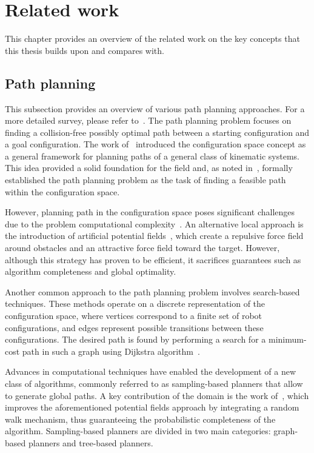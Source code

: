 \chapter{Related work}\label{chap:related_work}

This chapter provides an overview of the related work on the key concepts that this thesis builds upon and compares with.

\section{Path planning}

This subsection provides an overview of various path planning approaches. 
For a more detailed survey, please refer to~\cite{cLavalle, cFrazzoli, cKavraki}.
The path planning problem focuses on finding a collision-free possibly optimal path between a starting configuration and a goal configuration. 
The work of~\cite{cConfigSpace} introduced the configuration space concept as a general framework for planning paths of a general class of kinematic systems.
This idea provided a solid foundation for the field and, as noted in~\cite{cSpatialPlan}, formally established the path planning problem as the task of finding a feasible path within the configuration space.

However, planning path in the configuration space poses significant challenges due to the problem computational complexity~\cite{cComplexity}. 
An alternative local approach is the introduction of artificial potential fields~\cite{cAPF}, which create a repulsive force field around obstacles and an attractive force field toward the target.
However, although this strategy has proven to be efficient, it sacrifices guarantees such as algorithm completeness and global optimality.

Another common approach to the path planning problem involves search-based techniques. 
These methods operate on a discrete representation of the configuration space, where vertices correspond to a finite set of robot configurations, and edges represent possible transitions between these configurations.
The desired path is found by performing a search for a minimum-cost path in such a graph using Dijkstra algorithm~\cite{cDijk}. 

Advances in computational techniques have enabled the development of a new class of algorithms, commonly referred to as sampling-based planners that allow to generate global paths.
A key contribution of the domain is the work of~\cite{cLatombe}, which improves the aforementioned potential fields approach by integrating a random walk mechanism, thus guaranteeing the probabilistic completeness of the algorithm.
Sampling-based planners are divided in two main categories: graph-based planners and tree-based planners.

